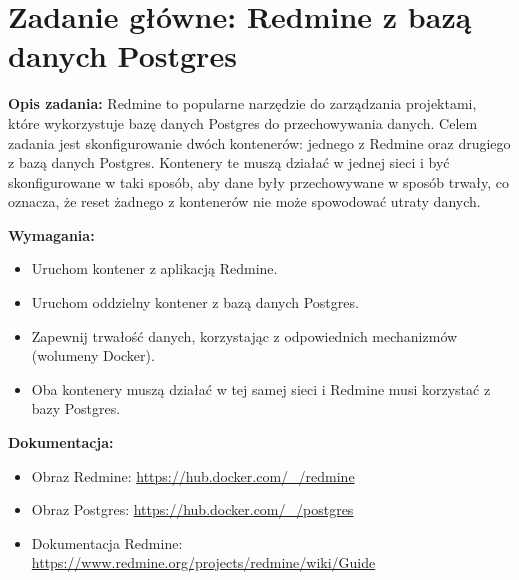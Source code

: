 \documentclass{article}
\begin{document}
\section{Zadanie główne: Redmine z bazą danych Postgres}

\textbf{Opis zadania:}  
Redmine to popularne narzędzie do zarządzania projektami, które wykorzystuje bazę danych Postgres do przechowywania danych. Celem zadania jest skonfigurowanie dwóch kontenerów: jednego z Redmine oraz drugiego z bazą danych Postgres. Kontenery te muszą działać w jednej sieci i być skonfigurowane w taki sposób, aby dane były przechowywane w sposób trwały, co oznacza, że reset żadnego z kontenerów nie może spowodować utraty danych.

\textbf{Wymagania:}
\begin{itemize}
    \item Uruchom kontener z aplikacją Redmine.
    \item Uruchom oddzielny kontener z bazą danych Postgres.
    \item Zapewnij trwałość danych, korzystając z odpowiednich mechanizmów (wolumeny Docker).
    \item Oba kontenery muszą działać w tej samej sieci i Redmine musi korzystać z bazy Postgres.
\end{itemize}

\textbf{Dokumentacja:}
\begin{itemize}
    \item Obraz Redmine: \url{https://hub.docker.com/_/redmine}
    \item Obraz Postgres: \url{https://hub.docker.com/_/postgres}
    \item Dokumentacja Redmine: \url{https://www.redmine.org/projects/redmine/wiki/Guide}
\end{itemize}
\end{document}
